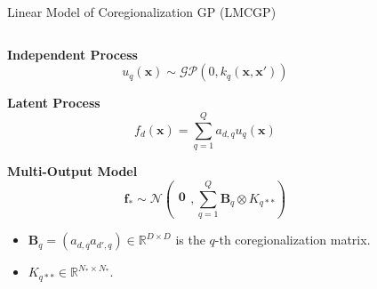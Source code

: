 \begin{frame}{Linear Model of Coregionalization GP (LMCGP)}
	
	\begin{columns}[T] %
	\begin{column}{0.5\textwidth}
		
		\textbf{Independent Process}
		\begin{equation*}
			u_{q}(\mathbf{x}) \sim \mathcal{GP}(0, k_{q}(\mathbf{x}, \mathbf{x}'))
		\end{equation*}	
		
		\textbf{Latent Process}
		\begin{equation*}
			f_{d}(\mathbf{x}) = \sum_{q=1}^Q a_{d,q} u_{q}(\mathbf{x})
		\end{equation*}
		
		\textbf{Multi-Output Model}
		\begin{equation*}
			\mathbf{f}_{*}
			\sim
			\mathcal{N} \left(
			\begin{array}{c}
				\mathbf{0}\\
			\end{array},
			\sum_{q=1}^Q \mathbf{B}_q \otimes K_{q**}\right)
		\end{equation*}
		
		\begin{itemize}
			\item  $\mathbf{B}_q = (a_{d,q}a_{d',q}) \in \mathbb{R}^{D \times D}$ is the $q$-th coregionalization matrix.
			
			\item $K_{q**} \in \mathbb{R}^{N_* \times N_*}$.
		\end{itemize}	

	\end{column}
	
	\begin{column}{0.5\textwidth}
		\setlength{} 
		\setlength{}
			
	\end{column}
	
\end{columns}
\end{frame}


